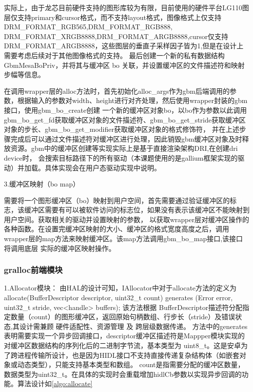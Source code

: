 实际上，由于龙芯目前硬件支持的图形库较为有限，目前使用的硬件平台LG110图层仅支持primary和cursor格式，而不支持layout格式，图像格式上仅支持DRM\_FORMAT\_RGB565,DRM\_FORMAT\_RGB888,
DRM\_FORMAT\_XRGB8888,DRM\_FORMAT\_ARGB8888,cursor仅支持DRM\_FORMAT\_ARGB8888，这些图层的垂直子采样因子皆为1,但是在设计上需要考虑后续对于其他图像格式的支持。
最后创建一个新的私有数据结构 GbmMesaBoPriv，并将其与缓冲区 bo 关联，并设置缓冲区的文件描述符和映射步幅等信息。

在调用wrapper层的alloc方法时，首先初始化alloc\_args作为gbm后端调用的参数，根据输入的参数对width、height进行对齐处理，然后使用wrapper封装的gbm接口，使用gbm\_bo\_create创建
一个新的缓冲区对象bo，以bo作为参数以此调用gbm\_bo\_get\_fd获取缓冲区对象的文件描述符、gbm\_bo\_get\_stride获取缓冲区对象的步长、gbm\_bo\_get\_modifier获取缓冲区对象的格式修饰符，
并在上述步骤完成后可以通过文件描述符对缓冲区进行处理，因此销毁gbm缓冲区对象及时释放资源。gbm中的缓冲区创建等实现实际上是基于直接渲染架构DRI,在创建dri device时，
会搜索目标路径下的所有驱动（本课题使用的是gallium框架实现的驱动）并加载。具体实现会在用户态驱动实现中说明。


3.缓冲区映射（bo map）

需要将一个图形缓冲区（bo）映射到用户空间，首先需要通过验证缓冲区的标志，该缓冲区需要有可以被软件访问的标志位，如果没有表示该缓冲区不能映射到用户空间。获取相关的驱动并设置映射的参数，
以获取wrapper层对缓冲区操作的各种函数。在设置完缓冲区映射的大小、缓冲区的格式宽度高度之后，调用wrapper层的map方法来映射缓冲区。该map方法调用gbm\_bo\_map接口,该接口将调用底层
实际的缓冲区映射操作。

\subsubsection{gralloc前端模块}

1.Allocator模块：
由HAL的设计可知，IAllocator中对于allocate方法的定义为
allocate(BufferDescriptor descriptor, uint32\_t count) generates (Error error, uint32\_t stride, vec<handle> buffers);
该方法根据 BufferDescriptor描述符分配指定数量（count）的图形缓冲区，返回原始句柄数组、行步长（stride）及错误状态,其设计需兼顾 硬件适配性、资源管理 及 跨层级数据传递。
方法中的generates表明需要实现一个异步回调接口，descriptor缓冲区描述符是Mappper模块实现的对缓冲区数据结构的序列化后的二进制字节流，基本类型为
uint8\_t。这是安卓为了跨进程传输所设计，也是因为HIDL接口不支持直接传递复杂结构体（如嵌套对象或动态类型），只能支持基本类型和数组。
count是指需要分配的缓冲区数量，数据类型为uint32\_t。在具体的实现时会重载增加hidlCb参数以实现异步回调的功能。算法设计如\ref{algo:allocate}


